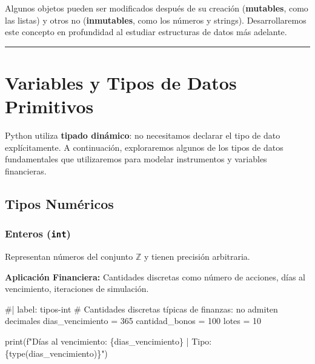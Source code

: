 \documentclass[
  spanish,
  letterpaper,
  DIV=11,
  numbers=noendperiod]{scrreprt}
\newenvironment{Shaded}{\begin{snugshade}}{\end{snugshade}}
\newcommand{\NormalTok}[1]{\textcolor[rgb]{0.00,0.23,0.31}{#1}}
\begin{document}
\begin{tcolorbox}[enhanced jigsaw, bottomrule=.15mm, colback=white, opacitybacktitle=0.6, arc=.35mm, toprule=.15mm, opacityback=0, breakable, titlerule=0mm, left=2mm, coltitle=black, colbacktitle=quarto-callout-note-color!10!white, colframe=quarto-callout-note-color-frame, leftrule=.75mm, toptitle=1mm, bottomtitle=1mm, title=\textcolor{quarto-callout-note-color}{\faInfo}\hspace{0.5em}{Mutabilidad e Inmutabilidad}, rightrule=.15mm]

Algunos objetos pueden ser modificados después de su creación
(\textbf{mutables}, como las listas) y otros no (\textbf{inmutables},
como los números y strings). Desarrollaremos este concepto en
profundidad al estudiar estructuras de datos más adelante.

\end{tcolorbox}

\begin{center}\rule{0.5\linewidth}{0.5pt}\end{center}

\section{Variables y Tipos de Datos
Primitivos}\label{variables-y-tipos-de-datos-primitivos}

Python utiliza \textbf{tipado dinámico}: no necesitamos declarar el tipo
de dato explícitamente. A continuación, exploraremos algunos de los
tipos de datos fundamentales que utilizaremos para modelar instrumentos
y variables financieras.

\subsection{Tipos Numéricos}\label{tipos-numuxe9ricos}

\subsubsection{\texorpdfstring{Enteros
(\texttt{int})}{Enteros (int)}}\label{enteros-int}

Representan números del conjunto \(\mathbb{Z}\) y tienen precisión
arbitraria.

\textbf{Aplicación Financiera:} Cantidades discretas como número de
acciones, días al vencimiento, iteraciones de simulación.

\begin{Shaded}
\begin{Highlighting}[]
\NormalTok{\#| label: tipos{-}int}
\NormalTok{\# Cantidades discretas típicas de finanzas: no admiten decimales}
\NormalTok{dias\_vencimiento = 365}
\NormalTok{cantidad\_bonos = 100}
\NormalTok{lotes = 10}

\NormalTok{print(f"Días al vencimiento: \{dias\_vencimiento\} | Tipo: \{type(dias\_vencimiento)\}")}
\end{Highlighting}
\end{Shaded}
\end{document}
